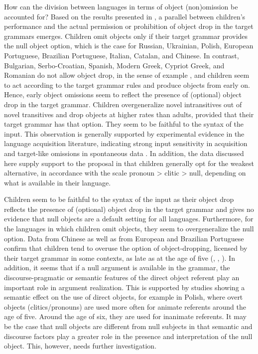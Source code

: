 \documentclass[output=paper,
modfonts,
newtxmath,
hidelinks,
]{langscibook}
\begin{document}
How can the division between languages in terms of object (non)omission be accounted for? Based on the results presented in , a parallel between children’s performance and the actual permission or prohibition of object drop in the target grammars emerges. Children omit objects only if their target grammar provides the null object option, which is the case for Russian, Ukrainian, Polish, European Portuguese, Brazilian Portuguese, Italian, Catalan, and Chinese. In contrast, Bulgarian, Serbo-Croatian, Spanish, Modern Greek, Cypriot Greek, and Romanian do not allow object drop, in the sense of example , and children seem to act according to the target grammar rules and produce objects from early on. Hence, early object omissions seem to reflect the presence of (optional) object drop in the target grammar. Children overgeneralize novel intransitives out of novel transitives and drop objects at higher rates than adults, provided that their target grammar has that option. They seem to be faithful to the syntax of the input. This observation is generally supported by experimental evidence in the language acquisition literature, indicating strong input sensitivity in acquisition and target-like omissions in spontaneous data \citep{Ingham1993}. In addition, the data discussed here supply support to the proposal in \citet{Varlokosta-etal2016} that children generally opt for the weakest alternative, in accordance with the scale pronoun > clitic > null, depending on what is available in their language.

Children seem to be faithful to the syntax of the input as their object drop reflects the presence of (optional) object drop in the target grammar and gives no evidence that null objects are a default setting for all languages. Furthermore, for the languages in which children omit objects, they seem to overgeneralize the null option. Data from Chinese as well as from European and Brazilian Portuguese confirm that children tend to overuse the option of object-dropping, licensed by their target grammar in some contexts, as late as at the age of five (\citealt{Wang-etal1992}, \citealt{Costa-etal2012}, \citealt{Lopes2009}). In addition, it seems that if a null argument is available in the grammar, the discourse-pragmatic or semantic features of the direct object referent play an important role in argument realization. This is supported by studies showing a semantic effect on the use of direct objects, for example in Polish, where overt objects (clitics/pronouns) are used more often for animate referents around the age of five. Around the age of six, they are used for inanimate referents. It may be the case that null objects are different from null subjects in that semantic and discourse factors play a greater role in the presence and interpretation of the null object. This, however, needs further investigation.
\end{document}
